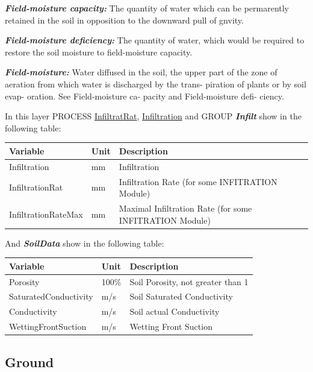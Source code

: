 \documentclass[
]{book}
\begin{document}
\textbf{\emph{Field-moisture capacity:}} The quantity of water which can be permarently retained in the soil in opposition to the downward pull of gnvity.\citep{Horton.1933}

\textbf{\emph{Field-moisture deficiency:}} The quantity of water, which would be required to restore the soil moisture to field-moisture capacity.\citep{Horton.1933}

\textbf{\emph{Field-moisture:}} Water diffused in the soil, the upper part of the zone of aeration from which water is discharged by the trans- piration of plants or by soil evap- oration. See Field-moisture ca- pacity and Field-moisture defi- ciency.

In this layer PROCESS \protect\hyperlink{InfiltratRat}{InfiltratRat}, \protect\hyperlink{Infiltration}{Infiltration} and GROUP \textbf{\emph{Infilt}} show in the following table:

\begin{table}[!h]
\centering
\begin{tabular}{l|l|l}
\hline
Variable & Unit & Description\\
\hline
Infiltration & mm & Infiltration\\
\cline{1-3}
InfiltrationRat & mm & Infiltration Rate (for some INFITRATION Module)\\
\cline{1-3}
InfiltrationRateMax & mm & Maximal Infiltration Rate (for some INFITRATION Module)\\
\hline
\end{tabular}
\end{table}

And \textbf{\emph{SoilData}} show in the following table:

\begin{table}[!h]
\centering
\begin{tabular}{l|l|l}
\hline
Variable & Unit & Description\\
\hline
Porosity & 100\% & Soil Porosity, not greater than 1\\
\cline{1-3}
SaturatedConductivity & m/s & Soil Saturated Conductivity\\
\cline{1-3}
Conductivity & m/s & Soil actual Conductivity\\
\cline{1-3}
WettingFrontSuction & m/s & Wetting Front Suction\\
\hline
\end{tabular}
\end{table}

\hypertarget{Ground1}{%
\subsection{Ground}\label{Ground1}}
\end{document}
